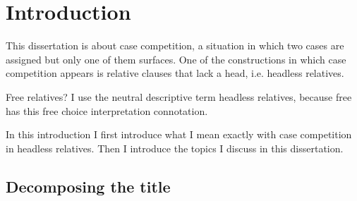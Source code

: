 
\chapter{Introduction}

This dissertation is about case competition, a situation in which two cases are assigned but only one of them surfaces. One of the constructions in which case competition appears is relative clauses that lack a head, i.e. headless relatives.

Free relatives? I use the neutral descriptive term headless relatives, because free has this free choice interpretation connotation.

%

In this introduction I first introduce what I mean exactly with case competition in headless relatives. Then I introduce the topics I discuss in this dissertation.


\section{Decomposing the title}


